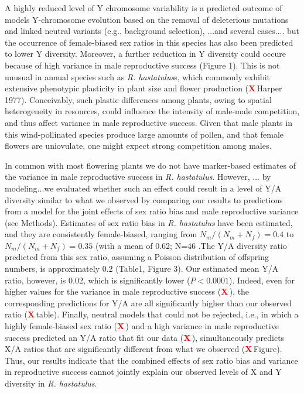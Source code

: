 \documentclass[9pt,twocolumn,twoside]{gsajnl}
\newcommand{\X}{\textcolor{red}{\bf X\,}}
\begin{document}
 A highly reduced level of Y chromosome variability is a predicted outcome of models Y-chromosome evolution based on the removal of deleterious mutations and linked neutral variants (e.g., background selection), ...and several cases.... but the occurrence of female-biased sex ratios in this species has also been predicted to lower Y diversity. Moreover, a further reduction in Y diversity could occure because of high variance in male reproductive success (Figure 1). This is not unusual in annual species such as \textit{R. hastatulus}s, which commonly exhibit extensive phenotypic plasticity in plant size and flower production (\X Harper 1977). Conceivably, such plastic differences among plants, owing to spatial heterogeneity in resources, could influence the intensity of male-male competition, and thus affect variance in male reproductive success. Given that male plants in this wind-pollinated species produce large amounts of pollen, and that female flowers are uniovulate, one might expect strong competition among males. 
 
 In common with most flowering plants we do not have marker-based estimates of the variance in male reproductive success in \textit{R. hastatulus}. However, ... by modeling...we evaluated whether such an effect could result in a level of Y/A diversity similar to what we observed by comparing our results to predictions from a  model for the joint effects of sex ratio bias and male reproductive variance (see Methods). Estimates of sex ratio bias in \textit{R. hastatulus} have been estimated, and they are consistently female-biased, ranging from $N_{m}/(N_{m}+N_{f})=0.4$ to $N_{m}/(N_{m}+N_{f})=0.35$ (with a mean of 0.62; N=46 \citep{pickup2013influence}.The Y/A diversity ratio predicted from this sex ratio, assuming a Poisson distribution of offspring numbers, is approximately 0.2 (Table1, Figure 3). Our estimated mean Y/A ratio, however, is 0.02, which is significantly lower ($\textit{P}<0.0001$). Indeed, even for higher values for the variance in male reproductive success (\X), the corresponding predictions for Y/A are all significantly higher than our observed ratio (\X table). Finally, neutral models that could not be rejected, i.e., in which a highly female-biased sex ratio (\X) and a high variance in male reproductive success predicted an Y/A ratio that fit our data (\X), simultaneously predicts X/A ratios that are significantly different from what we observed (\X Figure). Thus, our results indicate that the combined effects of sex ratio bias and variance in reproductive success cannot jointly explain our observed levels of X and Y diversity in \textit{R. hastatulus}.
\end{document}
